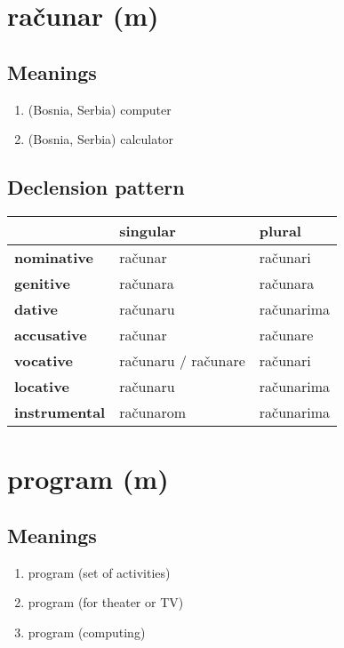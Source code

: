 \filbreak
\section{računar (m)}
\subsection*{Meanings}
\begin{enumerate}
\item (Bosnia, Serbia) computer
\item (Bosnia, Serbia) calculator
\end{enumerate}
\subsection*{Declension pattern}
\begin{tabularx}{\linewidth}{Xll}
\toprule
{} &             singular &      plural \\
\midrule
\textbf{nominative  } &              računar &    računari \\
\textbf{genitive    } &             računara &    računara \\
\textbf{dative      } &             računaru &  računarima \\
\textbf{accusative  } &              računar &    računare \\
\textbf{vocative    } &  računaru / računare &    računari \\
\textbf{locative    } &             računaru &  računarima \\
\textbf{instrumental} &            računarom &  računarima \\
\bottomrule
\end{tabularx}

\filbreak
\section{program (m)}
\subsection*{Meanings}
\begin{enumerate}
\item program (set of activities)
\item program (for theater or TV)
\item program (computing)
\end{enumerate}
